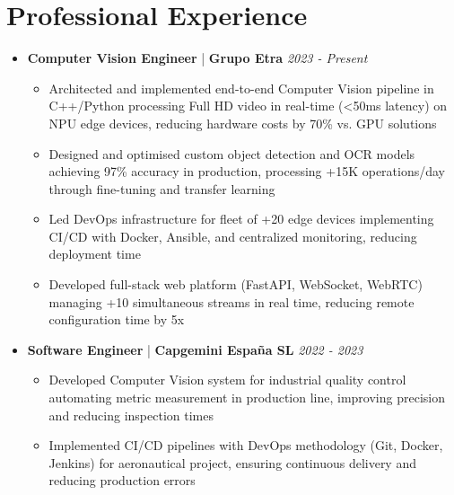 \documentclass[11pt]{article}
\begin{document}
\section*{Professional Experience}
\begin{itemize}[leftmargin=0em, itemsep=0.4em, parsep=0em]

  \item[] \textbf{\large Computer Vision Engineer } | \textbf{ Grupo Etra } \hfill \textit{ 2023 - Present }

  \begin{itemize}[leftmargin=1.2em, itemsep=0.05em, parsep=0em, topsep=0.15em]
  
    \item Architected and implemented end-to-end Computer Vision pipeline in C++/Python processing Full HD video in real-time (\textless{}50ms latency) on NPU edge devices, reducing hardware costs by 70\% vs. GPU solutions
  
    \item Designed and optimised custom object detection and OCR models achieving 97\% accuracy in production, processing +15K operations/day through fine-tuning and transfer learning
  
    \item Led DevOps infrastructure for fleet of +20 edge devices implementing CI/CD with Docker, Ansible, and centralized monitoring, reducing deployment time
  
    \item Developed full-stack web platform (FastAPI, WebSocket, WebRTC) managing +10 simultaneous streams in real time, reducing remote configuration time by 5x
  
  \end{itemize}

  \item[] \textbf{\large Software Engineer } | \textbf{ Capgemini España SL } \hfill \textit{ 2022 - 2023 }

  \begin{itemize}[leftmargin=1.2em, itemsep=0.05em, parsep=0em, topsep=0.15em]
  
    \item Developed Computer Vision system for industrial quality control automating metric measurement in production line, improving precision and reducing inspection times
  
    \item Implemented CI/CD pipelines with DevOps methodology (Git, Docker, Jenkins) for aeronautical project, ensuring continuous delivery and reducing production errors
  

\end{itemize}
\end{itemize}
\end{document}
